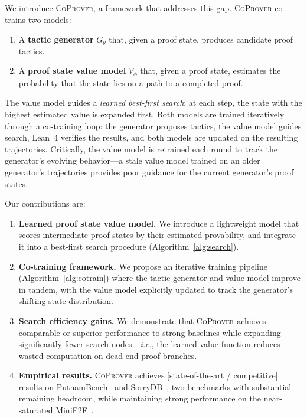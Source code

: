 \documentclass{article}
\newcommand{\coprover}{\textsc{CoProver}}
\newcommand{\ie}{\textit{i.e.}}
\begin{document}
We introduce \coprover{}, a framework that addresses this gap. \coprover{} co-trains two models:
\begin{enumerate}
    \item A \textbf{tactic generator} $G_\theta$ that, given a proof state, produces candidate proof tactics.
    \item A \textbf{proof state value model} $V_\phi$ that, given a proof state, estimates the probability that the state lies on a path to a completed proof.
\end{enumerate}

The value model guides a \emph{learned best-first search}: at each step, the state with the highest estimated value is expanded first. Both models are trained iteratively through a co-training loop: the generator proposes tactics, the value model guides search, Lean~4 verifies the results, and both models are updated on the resulting trajectories. Critically, the value model is retrained each round to track the generator's evolving behavior---a stale value model trained on an older generator's trajectories provides poor guidance for the current generator's proof states.

Our contributions are:
\begin{enumerate}
    \item \textbf{Learned proof state value model.} We introduce a lightweight model that scores intermediate proof states by their estimated provability, and integrate it into a best-first search procedure (Algorithm~\ref{alg:search}).
    \item \textbf{Co-training framework.} We propose an iterative training pipeline (Algorithm~\ref{alg:cotrain}) where the tactic generator and value model improve in tandem, with the value model explicitly updated to track the generator's shifting state distribution.
    \item \textbf{Search efficiency gains.} We demonstrate that \coprover{} achieves comparable or superior performance to strong baselines while expanding significantly fewer search nodes---\ie{}, the learned value function reduces wasted computation on dead-end proof branches.
    \item \textbf{Empirical results.} \coprover{} achieves [state-of-the-art / competitive] results on PutnamBench~\citep{tsoukalas2024putnambench} and SorryDB~\citep{letson2026sorrydb}, two benchmarks with substantial remaining headroom, while maintaining strong performance on the near-saturated MiniF2F~\citep{zheng2022minif2f}.
\end{enumerate}
\end{document}
